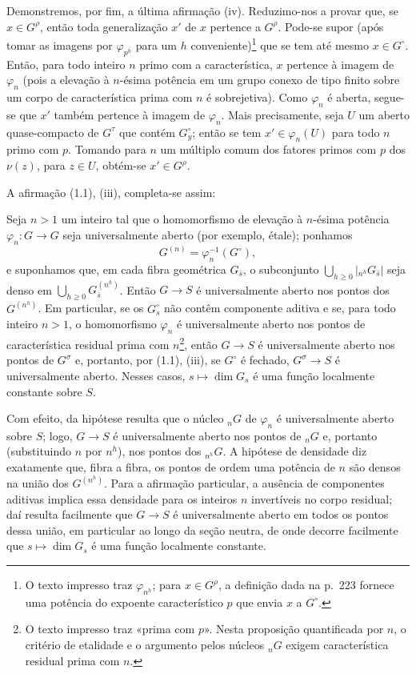 Demonstremos, por fim, a última afirmação (iv). Reduzimo-nos a provar que, se
$x\in G^\rho$, então toda generalização $x'$ de $x$ pertence a $G^\rho$.
Pode-se supor (após tomar as imagens por $\varphi_{p^h}$ para um $h$
conveniente)\footnote{O texto impresso traz $\varphi_{n^h}$; para
$x\in G^\rho$, a definição dada na p.~223 fornece uma potência do expoente
característico $p$ que envia $x$ a $G^\circ$.} que se tem até mesmo
$x\in G^\circ$. Então, para todo inteiro $n$ primo com a característica, $x$
pertence à imagem de $\varphi_n$ (pois a elevação à $n$-ésima potência em um
grupo conexo de tipo finito sobre um corpo de característica prima com $n$ é
sobrejetiva). Como $\varphi_n$ é aberta, segue-se que $x'$ também pertence à
imagem de $\varphi_n$. Mais precisamente, seja $U$ um aberto quase-compacto de
$G^\tau$ que contém $G_y^\circ$; então se tem $x'\in\varphi_n(U)$ para todo
$n$ primo com $p$. Tomando para $n$ um múltiplo comum dos fatores primos com
$p$ dos $\nu(z)$, para $z\in U$, obtém-se $x'\in G^\rho$.

A afirmação (1.1), (iii), completa-se assim:

 Seja $n>1$ um inteiro tal que o homomorfismo de
elevação à $n$-ésima potência $\varphi_n:G\longrightarrow G$ seja
universalmente aberto (por exemplo, étale); ponhamos
\[
G^{(n)}=\varphi_n^{-1}(G^\circ),
\]
e suponhamos que, em cada fibra geométrica $G_{\bar s}$, o subconjunto
$\bigcup_{h\geq0}|{}_{n^h}G_{\bar s}|$ seja denso em
$\bigcup_{h\geq0}G_{\bar s}^{(n^h)}$. Então $G\longrightarrow S$ é universalmente aberto nos
pontos dos $G^{(n^h)}$. Em particular, se os $G_s^\circ$ não contêm componente
aditiva e se, para todo inteiro $n>1$, o homomorfismo $\varphi_n$ é
universalmente aberto nos pontos de característica residual prima com
$n$\footnote{O texto impresso traz «prima com $p$». Nesta proposição
quantificada por $n$, o critério de etalidade e o argumento pelos núcleos
${}_nG$ exigem característica residual prima com $n$.}, então
$G\longrightarrow S$ é universalmente aberto nos pontos de $G^\sigma$ e,
portanto, por (1.1), (iii), se $G^\circ$ é fechado,
$G^\sigma\longrightarrow S$ é universalmente aberto. Nesses casos,
$s\longmapsto\dim G_s$ é uma função localmente constante sobre $S$.

Com efeito, da hipótese resulta que o núcleo ${}_nG$ de $\varphi_n$ é
universalmente aberto sobre $S$; logo, $G\longrightarrow S$ é universalmente
aberto nos pontos de ${}_nG$ e, portanto (substituindo $n$ por $n^h$), nos
pontos dos ${}_{n^h}G$. A hipótese de densidade diz exatamente que, fibra a fibra, os pontos de ordem
uma potência de $n$ são densos na união dos $G^{(n^h)}$. Para a afirmação
particular, a ausência de componentes aditivas implica essa densidade para os
inteiros $n$ invertíveis no corpo residual; daí resulta facilmente que
$G\longrightarrow S$ é universalmente aberto em todos os pontos dessa união,
em particular ao longo da seção neutra, de onde decorre facilmente que
$s\longmapsto\dim G_s$ é uma função localmente constante.

